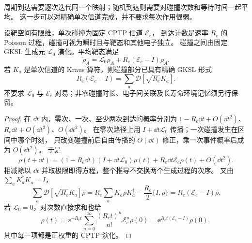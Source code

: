 周期到达需要逐次迭代同一个映射；随机到达则需要对碰撞次数和等待时间一起平均。
这一步可以对精确单次信道完成，并不要求每次作用很弱。
\begin{theorem}[独立随机碰撞的精确生成元]
设靶空间有限维，单次碰撞为固定 CPTP 信道 $\mathscr E_e$，
到达计数是速率 $R_e$ 的 Poisson 过程，碰撞可视为瞬时且与靶态和其他电子独立。
碰撞之间由固定 GKSL 生成元 $\mathcal L_0$ 演化。平均靶态满足
\begin{equation}
\dot\rho_A=\mathcal L_0\rho_A+R_e(\mathscr E_e-I)\rho_A.
\label{eq:collision-poisson-exact-generator}
\end{equation}
若 $K_a$ 是单次信道的 Kraus 算符，则碰撞部分已具有精确 GKSL 形式
\[
R_e(\mathscr E_e-I)=\sum_a\mathcal D[\sqrt{R_e}K_a].
\]
不要求 $\mathcal L_0$ 与 $\mathscr E_e$ 对易；非零碰撞时长、电子间关联及长寿命环境记忆须另行保留。
\end{theorem}
\begin{proof}
在 $\dd t$ 内，零次、一次、至少两次到达的概率分别为
$1-R_e\dd t+O(\dd t^2)$、$R_e\dd t+O(\dd t^2)$、$O(\dd t^2)$。
在零次路径上用 $I+\dd t\mathcal L_0$ 传播；一次碰撞发生在区间中哪个时刻，
只改变碰撞前后自由传播的 $O(\dd t)$ 修正，乘一次事件概率后成为 $O(\dd t^2)$。
于是
\[
\rho(t+\dd t)=(1-R_e\dd t)(I+\dd t\mathcal L_0)\rho(t)
+R_e\dd t\mathscr E_e\rho(t)+O(\dd t^2).
\]
相减除以 $\dd t$ 并取极限即得方程，整个推导不交换两个生成过程的次序。
又由 $\sum_aK_a^\dagger K_a=I$，
\[
\sum_a\mathcal D[\sqrt{R_e}K_a]\rho
=R_e\sum_aK_a\rho K_a^\dagger-\frac{R_e}{2}\{I,\rho\}
=R_e(\mathscr E_e-I)\rho.
\]
若 $\mathcal L_0=0$，对次数直接求和也给
\[
\rho(t)=\ee^{-R_et}\sum_{n=0}^\infty\frac{(R_et)^n}{n!}\mathscr E_e^n\rho(0)
=\ee^{R_et(\mathscr E_e-I)}\rho(0),
\]
其中每一项都是正权重的 CPTP 演化。
\end{proof}

